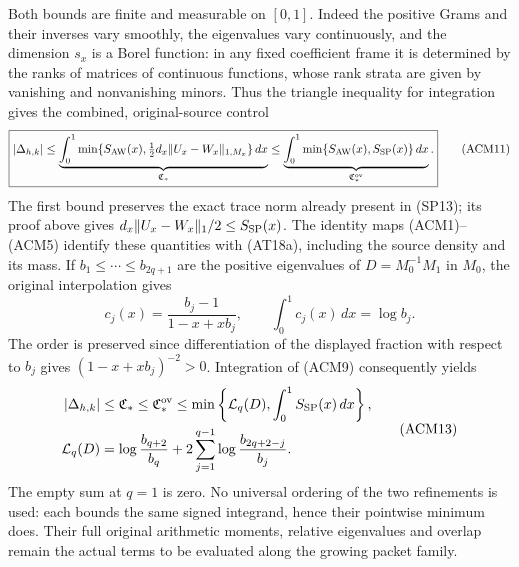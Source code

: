 Both bounds are finite and measurable on $[0,1]$. Indeed the positive
Grams and their inverses vary smoothly, the eigenvalues vary
continuously, and the dimension $s_x$ is a Borel function: in any
fixed coefficient frame it is determined by the ranks of matrices
of continuous functions, whose rank strata are given by vanishing
and nonvanishing minors. Thus the triangle inequality for integration
gives the combined, original-source control
\[
 \boxed{
 |\Delta_{h,k}|
 \le\underbrace{\int_0^1\min\{S_{\rm AW}(x),
       \tfrac12d_x\|U_x-W_x\|_{1,M_x}\}\,dx}_{\mathfrak C_*}
 \le\underbrace{\int_0^1\min\{S_{\rm AW}(x),S_{\rm SP}(x)\}\,dx}
                _{\mathfrak C_*^{\rm ov}}.}
 \tag{ACM11}
\]
The first bound preserves the exact trace norm already present in
(SP13); its proof above gives $d_x\|U_x-W_x\|_1/2\le S_{\rm SP}(x)$.
The identity maps (ACM1)--(ACM5) identify these quantities with
(AT18a), including the source density and its mass. If $b_1\le\cdots\le b_{2q+1}$ are the positive eigenvalues of
$D=M_0^{-1}M_1$ in $M_0$, the original interpolation gives
\[
 c_j(x)=\frac{b_j-1}{1-x+xb_j},\qquad
 \int_0^1c_j(x)\,dx=\log b_j.
 \tag{ACM12}
\]
The order is preserved since differentiation of the displayed
fraction with respect to $b_j$ gives $(1-x+xb_j)^{-2}>0$.
Integration of (ACM9) consequently yields
\[
 \begin{aligned}
 |\Delta_{h,k}|&\le\mathfrak C_*
 \le\mathfrak C_*^{\rm ov}
 \le\min\left\{\mathcal L_q(D),\int_0^1S_{\rm SP}(x)\,dx\right\},\\
 \mathcal L_q(D)&=\log\frac{b_{q+2}}{b_q}
       +2\sum_{j=1}^{q-1}\log\frac{b_{2q+2-j}}{b_j}.
 \end{aligned}
 \tag{ACM13}
\]
The empty sum at $q=1$ is zero. No universal ordering of the two
refinements is used: each bounds the same signed integrand, hence
their pointwise minimum does. Their full original arithmetic
moments, relative eigenvalues and overlap remain the actual terms
to be evaluated along the growing packet family.
